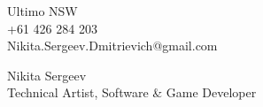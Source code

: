 \documentclass[]{cv-class}
\begin{document}
\thispagestyle{empty}

\begin{minipage}[t]{0.3\textwidth}
\begin{flushleft}
    \vspace{4pt}
    Ultimo NSW \\
    +61 426 284 203 \\
        {Nikita.Sergeev.Dmitrievich@gmail.com}
\end{flushleft}
\end{minipage}
\hfill
\begin{minipage}[t]{0.65\textwidth}
\begin{flushright}
    \vfill
    {\Huge
    \textcolor{candidate_name_col}{Nikita Sergeev} 
    } \\
    {\large Technical Artist, Software \& Game Developer
    }
\end{flushright}
\end{minipage}

\vspace{2pt}

\bigSeparator{2pt}

\vspace{-2pt}
\end{document}
